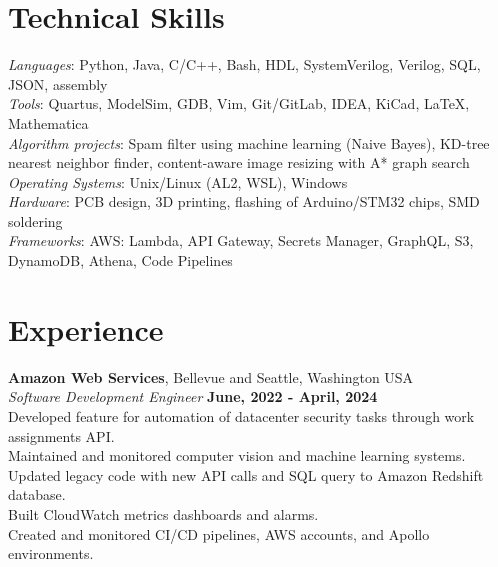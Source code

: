 \documentclass[margin,line]{res}
\newenvironment{list2}{
  \begin{list}{$\bullet$}{%
      \setlength{\itemsep}{0in}
      \setlength{\parsep}{0in} \setlength{\parskip}{0in}
      \setlength{\topsep}{0in} \setlength{\partopsep}{0in} 
      \setlength{\leftmargin}{0.2in}}}{\end{list}}
\begin{document}
\begin{resume}

\section{\sc Technical Skills} 
	{\em Languages}:  
	Python, Java, C/C++, Bash, HDL, SystemVerilog, Verilog, SQL, JSON, assembly
	\\
	{\em Tools}:  
	Quartus, ModelSim, GDB, Vim, Git/GitLab, IDEA, KiCad, \LaTeX, Mathematica 
	\\
	{\em Algorithm projects}: 
	Spam filter using machine learning (Naive Bayes), KD-tree
	nearest neighbor finder, content-aware image resizing with A* graph search
	\\
	{\em Operating Systems}:  
	Unix/Linux (AL2, WSL), Windows
	\\
	{\em Hardware}:  PCB design, 3D printing, flashing of Arduino/STM32 chips, SMD soldering
	\\
	{\em Frameworks}:  AWS: Lambda, API Gateway, Secrets Manager, GraphQL, S3, DynamoDB, Athena, Code Pipelines
	\\
%
%
\section{\sc Experience}

{\bf Amazon Web Services}, Bellevue and Seattle, Washington USA \\
{\em Software Development Engineer} \hfill {\bf June, 2022 - April, 2024} \\
Developed feature for automation of datacenter security tasks through work assignments API. \\
Maintained and monitored computer vision and machine learning systems. \\
Updated legacy code with new API calls and SQL query to Amazon Redshift database. \\
Built CloudWatch metrics dashboards and alarms. \\
Created and monitored CI/CD pipelines, AWS accounts, and Apollo environments. \\



\end{resume}
\end{document}

